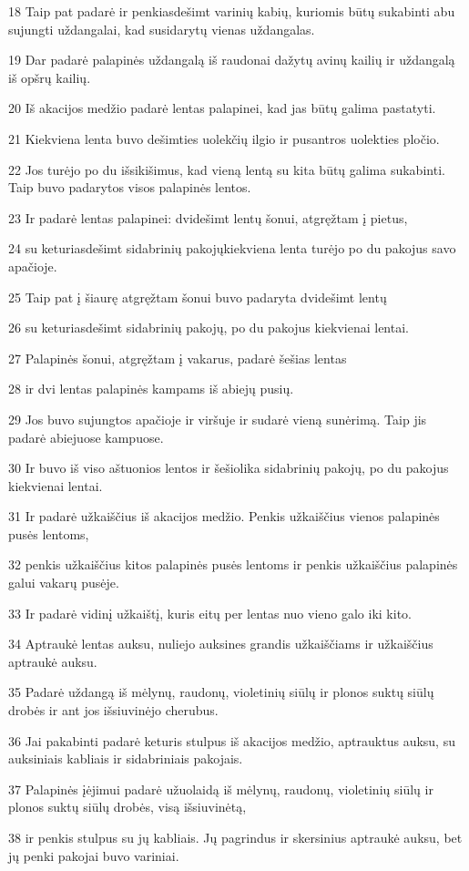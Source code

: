 \par 18 Taip pat padarė ir penkiasdešimt varinių kabių, kuriomis būtų sukabinti abu sujungti uždangalai, kad susidarytų vienas uždangalas. 
\par 19 Dar padarė palapinės uždangalą iš raudonai dažytų avinų kailių ir uždangalą iš opšrų kailių. 
\par 20 Iš akacijos medžio padarė lentas palapinei, kad jas būtų galima pastatyti. 
\par 21 Kiekviena lenta buvo dešimties uolekčių ilgio ir pusantros uolekties pločio. 
\par 22 Jos turėjo po du išsikišimus, kad vieną lentą su kita būtų galima sukabinti. Taip buvo padarytos visos palapinės lentos. 
\par 23 Ir padarė lentas palapinei: dvidešimt lentų šonui, atgręžtam į pietus, 
\par 24 su keturiasdešimt sidabrinių pakojų­kiekviena lenta turėjo po du pakojus savo apačioje. 
\par 25 Taip pat į šiaurę atgręžtam šonui buvo padaryta dvidešimt lentų 
\par 26 su keturiasdešimt sidabrinių pakojų, po du pakojus kiekvienai lentai. 
\par 27 Palapinės šonui, atgręžtam į vakarus, padarė šešias lentas 
\par 28 ir dvi lentas palapinės kampams iš abiejų pusių. 
\par 29 Jos buvo sujungtos apačioje ir viršuje ir sudarė vieną sunėrimą. Taip jis padarė abiejuose kampuose. 
\par 30 Ir buvo iš viso aštuonios lentos ir šešiolika sidabrinių pakojų, po du pakojus kiekvienai lentai. 
\par 31 Ir padarė užkaiščius iš akacijos medžio. Penkis užkaiščius vienos palapinės pusės lentoms, 
\par 32 penkis užkaiščius kitos palapinės pusės lentoms ir penkis užkaiščius palapinės galui vakarų pusėje. 
\par 33 Ir padarė vidinį užkaištį, kuris eitų per lentas nuo vieno galo iki kito. 
\par 34 Aptraukė lentas auksu, nuliejo auksines grandis užkaiščiams ir užkaiščius aptraukė auksu. 
\par 35 Padarė uždangą iš mėlynų, raudonų, violetinių siūlų ir plonos suktų siūlų drobės ir ant jos išsiuvinėjo cherubus. 
\par 36 Jai pakabinti padarė keturis stulpus iš akacijos medžio, aptrauktus auksu, su auksiniais kabliais ir sidabriniais pakojais. 
\par 37 Palapinės įėjimui padarė užuolaidą iš mėlynų, raudonų, violetinių siūlų ir plonos suktų siūlų drobės, visą išsiuvinėtą, 
\par 38 ir penkis stulpus su jų kabliais. Jų pagrindus ir skersinius aptraukė auksu, bet jų penki pakojai buvo variniai.



